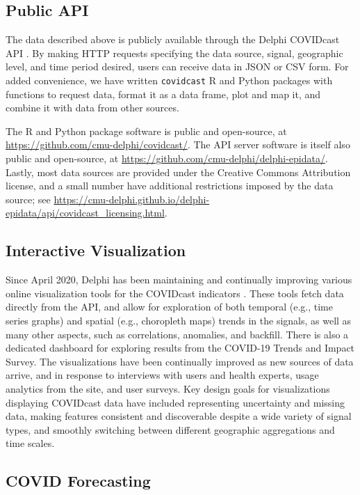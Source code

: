 \documentclass[9pt,twocolumn,twoside,lineno]{pnas-new}
\begin{document}
\subsection{Public API}

The data described above is publicly available through the Delphi COVIDcast API
\cite{CovidcastAPI}.  By making HTTP requests specifying the data source,
signal, geographic level, and time period desired, users can receive data in
JSON or CSV form. For added convenience, we have written \texttt{covidcast} R
\cite{CovidcastR} and Python \cite{CovidcastPy} packages with functions to
request data, format it as a data frame, plot and map it, and combine it with
data from other sources.

The R and Python package software is public and open-source, at
\url{https://github.com/cmu-delphi/covidcast/}.  The API server software is
itself also public and open-source, at
\url{https://github.com/cmu-delphi/delphi-epidata/}.  Lastly, most data sources
are provided under the Creative Commons Attribution license, and a small number
have additional restrictions imposed by the data source; see
\url{https://cmu-delphi.github.io/delphi-epidata/api/covidcast_licensing.html}.

\subsection{Interactive Visualization}

Since April 2020, Delphi has been maintaining and continually improving various
online visualization tools for the COVIDcast indicators \cite{CovidcastViz}.
These tools fetch data directly from the API, and allow for exploration of both
temporal (e.g., time series graphs) and spatial (e.g., choropleth maps) trends
in the signals, as well as many other aspects, such as correlations, anomalies,
and backfill. There is also a dedicated dashboard for exploring results from the
COVID-19 Trends and Impact Survey. The visualizations have been continually
improved as new sources of data arrive, and in response to interviews with users
and health experts, usage analytics from the site, and user surveys. Key design
goals for visualizations displaying COVIDcast data have included representing
uncertainty and missing data, making features consistent and discoverable
despite a wide variety of signal types, and smoothly switching between different
geographic aggregations and time scales.

\subsection{COVID Forecasting}
\end{document}
